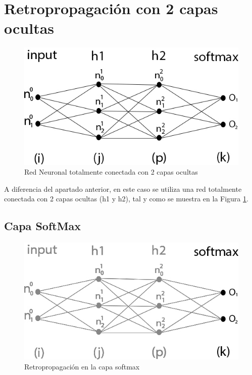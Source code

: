 \section{Retropropagación con 2 capas ocultas}

\begin{figure}[H]
	\centering
	\includegraphics[scale=0.35]{imagenes/nn_2_capas.jpg}  
	\caption{Red Neuronal totalmente conectada con 2 capas ocultas}
	\label{fig:nn_2_capas}
\end{figure}

A diferencia del apartado anterior, en este caso se utiliza una red totalmente conectada con 2 capas ocultas (h1 y h2), tal y como se muestra en la Figura \ref{fig:nn_2_capas}. \\

\subsection{Capa SoftMax}

\begin{figure}[H]
	\centering
	\includegraphics[scale=0.35]{imagenes/nn_2_capa_output.jpg}  
	\caption{Retropropagación en la capa softmax}
\end{figure}


